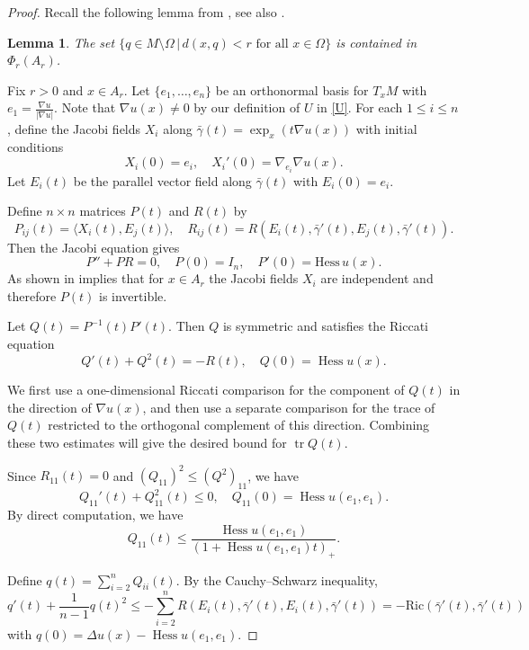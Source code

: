 \documentclass[psamsfonts]{amsart}
\newtheorem{lem}[thm]{Lemma}
\theoremstyle{definition}
\theoremstyle{remark}
\DeclareMathOperator{\tr}{tr}
\numberwithin{equation}{section}
\begin{document}
\begin{proof}
Recall the following lemma from \cite[Lemma 2.2]{chong2025sobolev}, see also \cite[Lemma 2.2]{Brendle2023}. 
\begin{lem}\label{lem:sobolev-image}
    The set $\{q \in M \setminus \Omega\, |\, d(x,q) <r \text{ for all } x \in \Omega \} $ is contained in $\Phi_r(A_r)$.
\end{lem}

Fix $r>0$ and $x \in A_r$. Let $\{e_1, \ldots, e_n\}$ be an orthonormal basis for $T_x M$ with $e_1 = \frac{\nabla u}{|\nabla u|}.$ Note that $\nabla u(x) \not= 0$ by our definition of $U$ in \eqref{U}. 
For each $1 \leq i \leq n$, define the Jacobi fields $X_i$ along $\bar \gamma(t) = \exp_x ( t \nabla u(x))$ with initial conditions
$$X_i(0) = e_i, \quad X_i'(0) = \nabla_{e_i}\nabla u (x).$$
Let $E_i(t)$ be the parallel vector field along $\bar \gamma(t)$ with $E_i(0) = e_i$.

Define $n\times n $ matrices $P(t)$ and $R(t)$ by $$P_{ij}(t) = \langle X_i(t), E_j(t)\rangle, \quad R_{ij}(t) = R(E_i(t), \bar \gamma'(t), E_j(t), \bar \gamma'(t)).$$
Then the Jacobi equation gives
$$P'' + PR = 0, \quad P(0) = I_n, \quad P'(0) = \mathrm{Hess} \,u(x).$$
As shown in  \cite[Lemma 5.6]{brendle2026} implies that for $x \in A_r$ the Jacobi fields $X_i$ are independent and therefore $P(t)$ is invertible. 

Let $Q(t) = P^{-1}(t) P'(t)$. Then $Q$ is symmetric and satisfies the Riccati equation
$$Q'(t) + Q^2 (t) = -R(t), \quad Q(0) = \operatorname{Hess} u(x ).$$

We first use a one-dimensional Riccati comparison for the component of $Q(t)$ in the direction of $\nabla u(x)$, and then use a separate comparison for the trace of $Q(t)$ restricted to the orthogonal complement of this direction.
Combining these two estimates will give the desired bound for $\tr Q(t)$.

Since $R_{11}(t) = 0$ and $(Q_{11})^2 \leq (Q^2)_{11}$, we have
$$Q_{11}'(t) + Q_{11}^2 (t) \leq 0, \quad Q_{11}(0) = \operatorname{Hess} u(e_1,e_1).$$
By direct computation, we have
$$Q_{11}(t) \leq \frac{\operatorname{Hess} u (e_1,e_1)}{ (1+ \operatorname{Hess} u (e_1,e_1) t)_+}.$$

Define
$q(t) = \sum_{i=2}^n Q_{ii}(t)$.
By the Cauchy--Schwarz inequality,
$$q'(t) + \frac{1}{n-1}q(t)^2 \leq - \sum_{i=2}^n R(E_i(t), \bar \gamma'(t), E_i(t), \bar \gamma'(t)) = - \mathrm{Ric}(\bar \gamma'(t), \bar \gamma'(t))$$
with $q(0) = \Delta u(x) -\operatorname{Hess} u(e_1,e_1)$.



\end{proof}
\end{document}
